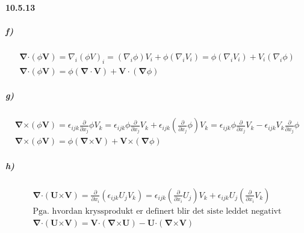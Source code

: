 \documentclass[11pt, A4paper,norsk]{article}
\begin{document}
		\paragraph{10.5.13}
			\subparagraph{f)}
				\begin{gather*}
\boldsymbol{\nabla} \boldsymbol{\cdot} (\phi \boldsymbol{V}) = \nabla_i (\phi V)_i = (\nabla_i \phi) V_i + \phi (\nabla_i V_i) = \phi (\nabla_i V_i) + V_i (\nabla_i \phi) \\
\boldsymbol{\nabla} \boldsymbol{\cdot} (\phi \boldsymbol{V}) = \phi (\boldsymbol{\nabla} \cdot \boldsymbol{V}) + \boldsymbol{V} \cdot (\boldsymbol{\nabla} \phi)
				\end{gather*}












			\subparagraph{g)}
				\begin{gather*}
\boldsymbol{\nabla} \boldsymbol{\times} (\phi \boldsymbol{V}) = \epsilon_{ijk} \frac{\partial}{\partial x_j} \phi V_k = \epsilon_{ijk} \phi \frac{\partial}{\partial x_j} V_k + \epsilon_{ijk} \left(\frac{\partial}{\partial x_j} \phi\right) V_k = \epsilon_{ijk} \phi  \frac{\partial}{\partial x_j} V_k - \epsilon_{ijk} V_k  \frac{\partial}{\partial x_j} \phi \\
\boldsymbol{\nabla} \boldsymbol{\times} (\phi \boldsymbol{V}) = \phi (\boldsymbol{\nabla} \boldsymbol{\times} \boldsymbol{V}) + \boldsymbol{V} \boldsymbol{\times} (\boldsymbol{\nabla} \phi)
				\end{gather*}












			\subparagraph{h)}
				\begin{gather*}
\boldsymbol{\nabla} \boldsymbol{\cdot} (\boldsymbol{U} \boldsymbol{\times} \boldsymbol{V}) = \frac{\partial}{\partial x_i} (\epsilon_{ijk} U_{j} V_{k}) = \epsilon_{ijk} \left(\frac{\partial}{\partial x_i} U_{j}\right) V_{k} + \epsilon_{ijk} U_{j} \left(\frac{\partial}{\partial x_i} V_{k}\right) \\
\text{Pga. hvordan kryssprodukt er definert blir det siste leddet negativt} \\
\boldsymbol{\nabla} \boldsymbol{\cdot} (\boldsymbol{U} \boldsymbol{\times} \boldsymbol{V}) = \boldsymbol{V} \boldsymbol{\cdot} (\boldsymbol{\nabla} \boldsymbol{\times} \boldsymbol{U}) - \boldsymbol{U} \boldsymbol{\cdot} (\boldsymbol{\nabla} \boldsymbol{\times} \boldsymbol{V})
				\end{gather*}
\end{document}
